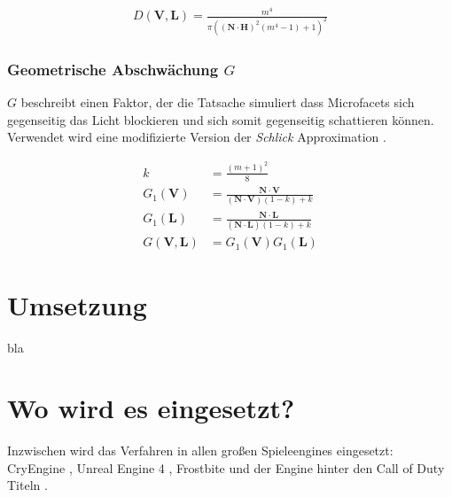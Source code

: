 \begin{align}
	\label{eq:ggx}
	D(\mathbf V,\mathbf L) = \frac{m^4}{ \pi \left(\left( \mathbf N \cdot \mathbf H \right)^2\left(m^4 - 1\right) + 1\right)^2}
\end{align}


\subsubsection[Geometrische Abschwächung]{Geometrische Abschwächung $G$} 
$G$ beschreibt einen Faktor, der die Tatsache simuliert dass Microfacets sich gegenseitig das Licht blockieren und sich somit gegenseitig schattieren können. Verwendet wird eine modifizierte Version der \textit{Schlick} Approximation .


\begin{align}
	\label{eq:geometric-schlick}
	k &= \frac{(m + 1)^2}{8}\\
	G_1(\mathbf V) &= \frac{\mathbf N \cdot \mathbf V}{(\mathbf N \cdot \mathbf V)(1-k)+k}\\
	G_1(\mathbf L) &= \frac{\mathbf N \cdot \mathbf L}{(\mathbf N \cdot \mathbf L)(1-k)+k}\\
	G(\mathbf V,\mathbf L) &= G_1(\mathbf V) G_1(\mathbf L)
\end{align}


\section{Umsetzung}
\label{sec:pbr-umsetzung}

bla

\section{Wo wird es eingesetzt?}
\label{sec:pbr-wo}
Inzwischen wird das Verfahren in allen großen Spieleengines eingesetzt: CryEngine \parencite{Schulz2014}, Unreal Engine 4 \parencite{Martin2012}, Frostbite \parencite{Lagarde2014} und der Engine hinter den Call of Duty Titeln \parencite{Lazarov2011}.
